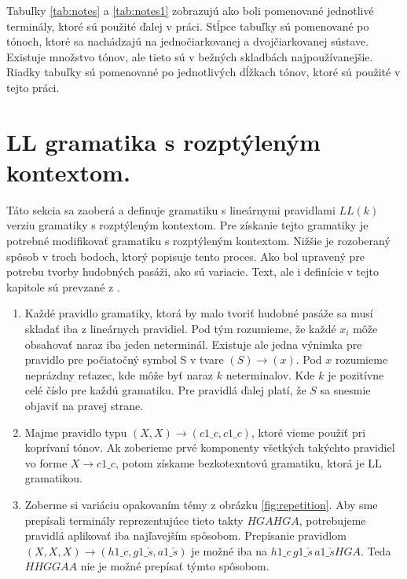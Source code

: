 Tabuľky \ref{tab:notes} a \ref{tab:notes1} zobrazujú ako boli pomenované jednotlivé terminály, ktoré sú použité ďalej v práci. Stĺpce tabuľky sú pomenované po tónoch, ktoré sa nachádzajú na jednočiarkovanej a dvojčiarkovanej sústave. Existuje množstvo tónov, ale tieto sú v bežných skladbách najpoužívanejšie. Riadky tabuľky sú pomenované po jednotlivých dĺžkach tónov, ktoré sú použité v tejto práci.

\section{LL gramatika s rozptýleným kontextom.}
Táto sekcia sa zaoberá a definuje gramatiku s lineárnymi pravidlami $LL(k)$ verziu gramatiky s rozptýleným kontextom. Pre získanie tejto gramatiky je potrebné modifikovať gramatiku s rozptýleným kontextom. Nižšie je rozoberaný spôsob v troch bodoch, ktorý popisuje tento proces. Ako bol upravený pre potrebu tvorby hudobných pasáži, ako sú variacie. Text, ale i definície v tejto kapitole sú prevzané z \cite{FITPUB10498}.

\begin{enumerate}[label=\arabic*)]
    \item Každé pravidlo gramatiky, ktorá by malo tvoriť hudobné pasáže sa musí skladať iba z lineárnych pravidiel. Pod tým rozumieme, že každé $x_i$ môže obsahovať naraz iba jeden neterminál. Existuje ale jedna výnimka pre pravidlo pre počiatočný symbol S v tvare $(S) \rightarrow (x)$. Pod $x$ rozumieme neprázdny reťazec, kde môže byť naraz $k$ neterminalov. Kde $k$ je pozitívne celé číslo pre každú gramatiku. Pre pravidlá ďalej platí, že $S$ sa snesmie objaviť na pravej strane.
    
    \item Majme pravidlo typu $(X,X) \rightarrow (c1\_c, c1\_c)$, ktoré vieme použiť pri koprívaní tónov. Ak zoberieme prvé komponenty všetkých takýchto pravidiel vo forme $X \rightarrow c1\_c$, potom získame bezkotexntovú gramatiku, ktorá je LL gramatikou.
    
    \item Zoberme si variáciu opakovaním témy z obrázku \ref{fig:repetition}. Aby sme prepísali terminály reprezentujúce tieto takty $HGAHGA$, potrebujeme pravidlá aplikovať iba najľavejším spôsobom. Prepísanie pravidlom $(X,X,X) \rightarrow (h1\_c, g1\_\check{s}, a1\_\check{s})$ je možné iba na $h1\_c \, g1\_\check{s} \, a1\_\check{s}HGA$. Teda $HHGGAA$ nie je možné prepísať týmto spôsobom.
\end{enumerate}

